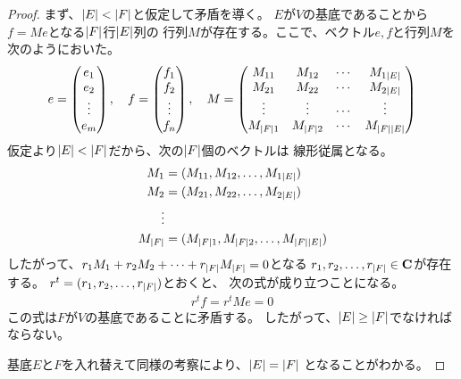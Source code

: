 \begin{proof}
		まず、$\left|{E}\right|<\left|{F}\right|$と仮定して矛盾を導く。
		$E$が$V$の基底であることから$f=Me$となる$\left|{F}\right|$行$\left|{E}\right|$列の
		行列$M$が存在する。ここで、ベクトル$e,f$と行列$M$を次のようにおいた。
		\begin{equation*}\begin{split} %
			e = \begin{pmatrix}
			e_1 \\ e_2 \\ \vdots \\ e_m
			\end{pmatrix},\quad f = \begin{pmatrix}
			f_1 \\ f_2 \\ \vdots \\ f_n
			\end{pmatrix},\quad M = \begin{pmatrix}
			M_{11} & M_{12} & \cdots & M_{1\zettai{E}} \\
			M_{21} & M_{22} & \cdots & M_{2\zettai{E}} \\
			\vdots & \vdots & \cdots & \vdots \\
			M_{\zettai{F}1} & M_{\zettai{F}2} & \cdots & M_{\zettai{F}\zettai{E}} \\
			\end{pmatrix}
		\end{split}\end{equation*} %
		仮定より$\left|{E}\right|<\left|{F}\right|$だから、次の$\left|{F}\right|$個のベクトルは
		線形従属となる。
		\begin{equation*}\begin{split} %
			M_1 &= (M_{11}, M_{12}, \dots, M_{1\zettai{E}}) \\
			M_2 &= (M_{21}, M_{22}, \dots, M_{2\zettai{E}}) \\
			\vdots \\
			M_{\zettai{F}} &= (M_{\zettai{F}1}, M_{\zettai{F}2}, \dots, M_{\zettai{F}\zettai{E}}) \\
		\end{split}\end{equation*} %
		したがって、$r_1M_1+r_2M_2+\cdots+r_{\left|{F}\right|}M_{\left|{F}\right|}=0$となる
		$r_1,r_2,\dots,r_{\left|{F}\right|}\in{\ensuremath{\mathbf{C}}}$が存在する。
		$r^t=(r_1,r_2,\dots,r_{\left|{F}\right|})$とおくと、
		次の式が成り立つことになる。
		\begin{equation*}\begin{split} %
			r^tf = r^tMe = 0
		\end{split}\end{equation*} %
		この式は$F$が$V$の基底であることに矛盾する。
		したがって、$\left|{E}\right|\ge\left|{F}\right|$でなければならない。

		基底$E$と$F$を入れ替えて同様の考察により、$\left|{E}\right|=\left|{F}\right|$
		となることがわかる。
	\end{proof} %

